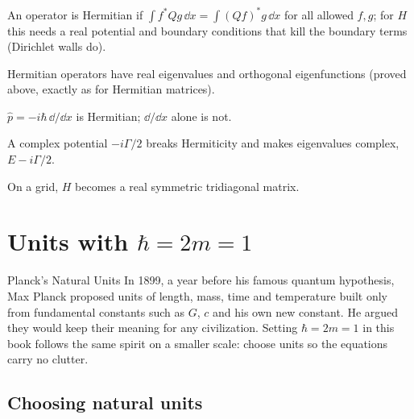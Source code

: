 \begin{keyideas}
\item An operator is Hermitian if $\int f^*Qg\,\dd x=\int(Qf)^*g\,\dd x$ for all allowed $f,g$; for $H$ this needs a real potential and boundary conditions that kill the boundary terms (Dirichlet walls do).
\item Hermitian operators have real eigenvalues and orthogonal eigenfunctions (proved above, exactly as for Hermitian matrices).
\item $\hat p=-i\hbar\,\dd/\dd x$ is Hermitian; $\dd/\dd x$ alone is not.
\item A complex potential $-i\Gamma/2$ breaks Hermiticity and makes eigenvalues complex, $E-i\Gamma/2$.
\item On a grid, $H$ becomes a real symmetric tridiagonal matrix.
\end{keyideas}

\section{Units with $\hbar=2m=1$}\label{sec:schrodinger-units}
\begin{didyouknow}{Planck's Natural Units}
In 1899, a year before his famous quantum hypothesis, Max Planck proposed units of length, mass, time and temperature built only from fundamental constants such as $G$, $c$ and his own new constant. He argued they would keep their meaning for any civilization. Setting $\hbar=2m=1$ in this book follows the same spirit on a smaller scale: choose units so the equations carry no clutter.
\end{didyouknow}

\subsection{Choosing natural units}

